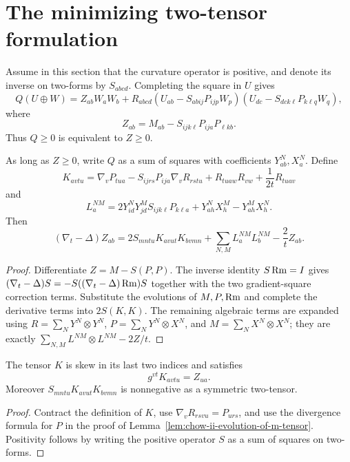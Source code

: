 \section{The minimizing two-tensor formulation}

Assume in this section that the curvature operator is positive, and denote its
inverse on two-forms by \(S_{abcd}\).  Completing the square in \(U\) gives
\[
Q(U\oplus W)=Z_{ab}W_aW_b
+R_{abcd}(U_{ab}-S_{abij}P_{ijp}W_p)
 (U_{dc}-S_{dck\ell}P_{k\ell q}W_q),
\]
where
\[
Z_{ab}=M_{ab}-S_{ijk\ell}P_{ija}P_{\ell kb}.
\]
Thus \(Q\ge0\) is equivalent to \(Z\ge0\).

\begin{theorem}
\label{thm:chow-ii-minimizing-harnack-two-tensor-evolution}


As long as \(Z\ge0\), write \(Q\) as a sum of squares with coefficients
\(Y^N_{ab},X^N_a\).  Define
\[
K_{avtu}=\nabla_vP_{tua}-S_{ijrs}P_{ija}\nabla_vR_{rstu}
+R_{tuaw}R_{vw}+\frac1{2t}R_{tuav}
\]
and
\[
L_a^{NM}=2Y_{id}^NY_{jd}^MS_{ijk\ell}P_{k\ell a}
+Y_{ah}^NX_h^M-Y_{ah}^MX_h^N.
\]
Then
\[
(\nabla_t-\Delta)Z_{ab}=2S_{mntu}K_{avut}K_{bvmn}
+\sum_{N,M}L_a^{NM}L_b^{NM}-\frac2tZ_{ab}.
\]
\end{theorem}
\begin{proof}
\sketch Differentiate \(Z=M-S(P,P)\).  The inverse identity \(S\operatorname{Rm}=I\) gives
\((\nabla_t-\Delta)S=-S((\nabla_t-\Delta)\operatorname{Rm})S\) together with the two
gradient-square correction terms.  Substitute the evolutions of \(M,P,\operatorname{Rm}\)
and complete the derivative terms into \(2S(K,K)\).  The remaining algebraic
terms are expanded using
\(R=\sum_NY^N\otimes Y^N\),
\(P=\sum_NY^N\otimes X^N\), and
\(M=\sum_NX^N\otimes X^N\); they are exactly
\(\sum_{N,M}L^{NM}\otimes L^{NM}-2Z/t\).
\end{proof}

\begin{remark}
\label{rem:chow-ii-k-tensor-trace-is-z}


The tensor \(K\) is skew in its last two indices and satisfies
\[
g^{vt}K_{avtu}=Z_{ua}.
\]
Moreover \(S_{mntu}K_{avut}K_{bvmn}\) is nonnegative as a symmetric
two-tensor.
\end{remark}
\begin{proof}
\sketch Contract the definition of \(K\), use
\(\nabla_vR_{rsvu}=P_{urs}\), and use the divergence formula for \(P\) in
the proof of Lemma~\ref{lem:chow-ii-evolution-of-m-tensor}.  Positivity follows
by writing the positive operator \(S\) as a sum of squares on two-forms.
\end{proof}

